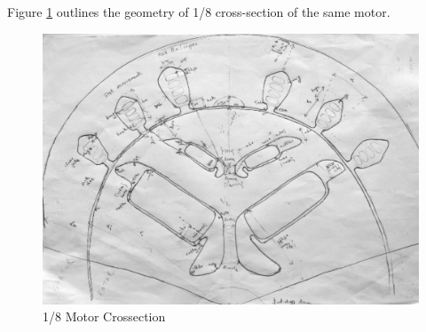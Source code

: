 \documentclass{report} %
\begin{document}
Figure \ref{fig:1/8 Motor Crossection} outlines the geometry of 1/8 cross-section of the same motor.

\begin{figure}[H]
    \centering
    \includegraphics[width=1\textwidth]{./ReportImages/EMCrosssectionFiltered.png} 
    \caption{1/8 Motor Crossection}
    \label{fig:1/8 Motor Crossection}
\end{figure}

\newpage 
\end{document}
